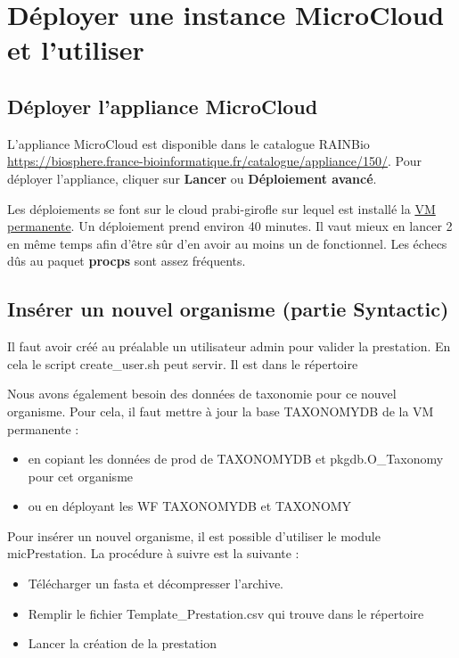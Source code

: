 \chapter{Déployer une instance MicroCloud et l'utiliser}

\section{Déployer l'appliance MicroCloud}

L'appliance MicroCloud est disponible dans le catalogue RAINBio \url{https://biosphere.france-bioinformatique.fr/catalogue/appliance/150/}. Pour déployer l'appliance, cliquer sur \textbf{Lancer} ou \textbf{Déploiement avancé}.

Les déploiements se font sur le cloud prabi-girofle sur lequel est installé la \hyperref[VM permanente]{VM permanente}.
Un déploiement prend environ 40 minutes.
Il vaut mieux en lancer 2 en même temps afin d'être sûr d'en avoir au moins un de fonctionnel.
Les échecs dûs au paquet \textbf{procps} sont assez fréquents.

\section{Insérer un nouvel organisme (partie Syntactic)}
Il faut avoir créé au préalable un utilisateur admin pour valider la prestation. En cela le script create\_user.sh peut servir.
Il est dans le répertoire 
\bigskip

Nous avons également besoin des données de taxonomie pour ce nouvel organisme. Pour cela, il faut mettre à jour la base TAXONOMYDB de la VM permanente :
\begin{itemize}
	\item en copiant les données de prod de TAXONOMYDB et pkgdb.O\_Taxonomy pour cet organisme
	\item ou en déployant les WF TAXONOMYDB et TAXONOMY
\end{itemize}
\bigskip

Pour insérer un nouvel organisme, il est possible d’utiliser le module micPrestation.
La procédure à suivre est la suivante :
\begin{itemize}
	\item Télécharger un fasta et décompresser l'archive.
	\item Remplir le fichier Template\_Prestation.csv qui trouve dans le répertoire 
	\item Lancer la création de la prestation
\end{itemize}

